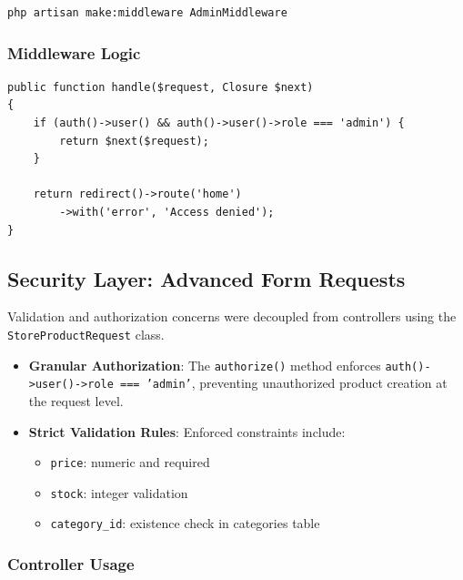 \documentclass[12pt,a4paper]{article}
\begin{document}
\begin{verbatim}
php artisan make:middleware AdminMiddleware
\end{verbatim}

\subsubsection{Middleware Logic}

\begin{verbatim}
public function handle($request, Closure $next)
{
    if (auth()->user() && auth()->user()->role === 'admin') {
        return $next($request);
    }

    return redirect()->route('home')
        ->with('error', 'Access denied');
}
\end{verbatim}


\subsection{Security Layer: Advanced Form Requests}

Validation and authorization concerns were decoupled from controllers using the \texttt{StoreProductRequest} class.

\begin{itemize}
    \item \textbf{Granular Authorization}: The \texttt{authorize()} method enforces \texttt{auth()->user()->role === 'admin'}, preventing unauthorized product creation at the request level.
    
    \item \textbf{Strict Validation Rules}: Enforced constraints include:
    \begin{itemize}
        \item \texttt{price}: numeric and required
        \item \texttt{stock}: integer validation
        \item \texttt{category\_id}: existence check in categories table
    \end{itemize}
\end{itemize}

\subsubsection{Controller Usage}
\end{document}
